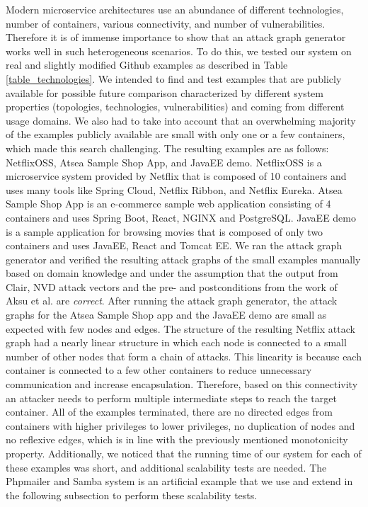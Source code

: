 Modern microservice architectures use an abundance of different technologies,  number of containers, various connectivity, and number of vulnerabilities. Therefore it is of immense importance to show that an attack graph generator works well in such heterogeneous scenarios. To do this, we tested our system on real and slightly modified Github examples as described in Table \ref{table_technologies}. We intended to find and test examples that are publicly available for possible future comparison characterized by different system properties (topologies, technologies, vulnerabilities) and coming from different usage domains. We also had to take into account that an overwhelming majority of the examples publicly available are small with only one or a few containers, which made this search challenging. The resulting examples are as follows: NetflixOSS, Atsea Sample Shop App, and JavaEE demo. NetflixOSS is a microservice system provided by Netflix that is composed of 10 containers and uses many tools like Spring Cloud, Netflix Ribbon, and Netflix Eureka. Atsea Sample Shop App is an e-commerce sample web application consisting  of 4 containers and uses Spring Boot, React, NGINX and PostgreSQL. JavaEE demo is a sample application for browsing movies that is composed of only two containers and uses JavaEE, React and Tomcat EE. We ran the attack graph generator and verified the resulting attack graphs of the small examples manually based on domain knowledge and under the assumption that the output from Clair, NVD attack vectors \cite{booth2013national} and the pre- and postconditions from the work of Aksu et al. \cite{aksu2018automated} are \textit{correct}. After running the attack graph generator, the attack graphs for the Atsea Sample Shop app and the JavaEE demo are small as expected with few nodes and edges. The structure of the resulting Netflix attack graph had a nearly linear structure in which each node is connected to a small number of other nodes that form a chain of attacks. This linearity is because each container is connected to a few other containers to reduce unnecessary communication and increase encapsulation. Therefore, based on this connectivity an attacker needs to perform multiple intermediate steps to reach the target container. All of the examples terminated, there are no directed edges from containers with higher privileges to lower privileges, no duplication of nodes and no reflexive edges, which is in line with the previously mentioned monotonicity property. Additionally, we noticed that the running time of our system for each of these examples was short, and additional scalability tests are needed. The Phpmailer and Samba  system is an artificial example that we use and extend in the following subsection to perform these scalability tests.



